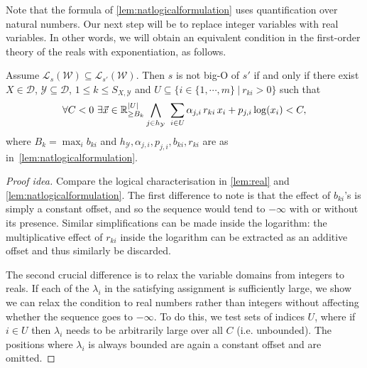 \documentclass{lmcs}
\theoremstyle{plain}
\theoremstyle{definition}
\theoremstyle{remark}
\newcommand\lng[2]{\mathcal{L}_{#1}(#2)}
\newcommand\revar{x}
\newcommand\revec{\vec{x}}
\newcommand\basevecraw{b}
\newcommand\pvecraw{r}
\newcommand\adm{\mathcal{D}}
\newcommand\wa{\mathcal{W}}
\begin{document}
Note that the formula of \cref{lem:natlogicalformulation} uses quantification over natural numbers. Our next step will be to replace integer variables with real variables. In other words, we will obtain an equivalent condition in the first-order theory of the reals with exponentiation, as follows.
\begin{lem}\label{lem:real}
Assume  $\lng{s}{\wa}\subseteq \lng{s'}{\wa}$. Then
$s$ is not big-O of $s'$ if and only if there exist $X\in\adm$, $\mathcal{Y}\subseteq\adm$, $1\le k\le S_{X,\mathcal{Y}}$ and $U\subseteq  \{i \in \{1,\cdots,m\} \ | \ \pvecraw_{ki} > 0 \}$ such that
\[
\forall C < 0 \  \exists \revec \in \mathbb{R}^{|U|}_{\ge B_k}\\
\bigwedge_{j\in h_\mathcal{Y}}\   \sum_{i \in U} \alpha_{j,i}\, \pvecraw_{ki}\, \revar_i + p_{j,i}\log(\revar_i) < C,
\]
where $B_k=\max_i{\basevecraw_{ki}}$ and $h_\mathcal{Y}, \alpha_{j,i}, p_{j,i}, \basevecraw_{ki},  \pvecraw_{ki}$ are as in~\cref{lem:natlogicalformulation}.
\end{lem}
\begin{proof}[Proof idea]
Compare the logical characterisation in \cref{lem:real} and \cref{lem:natlogicalformulation}. The first difference to note is that the effect of $\basevecraw_{ki}$'s is simply a constant offset, and so the sequence would tend to $-\infty$ with or without its presence. Similar simplifications can be made inside the logarithm: the multiplicative effect of $\pvecraw_{ki}$ inside the logarithm can be extracted as an additive offset and thus similarly be discarded.

The second crucial difference is to relax the variable domains from integers to  reals. If each of the $\lambda_i$ in the satisfying assignment is sufficiently large, we show we  can relax the condition to real numbers rather than integers without affecting whether the sequence goes to $-\infty$. To do this, we test sets of indices $U$, where if $i\in U$ then $\lambda_i$ needs to be arbitrarily large over all $C$ (i.e. unbounded). The positions where $\lambda_i$ is always bounded are again a constant offset and are omitted.
\end{proof}
\end{document}
